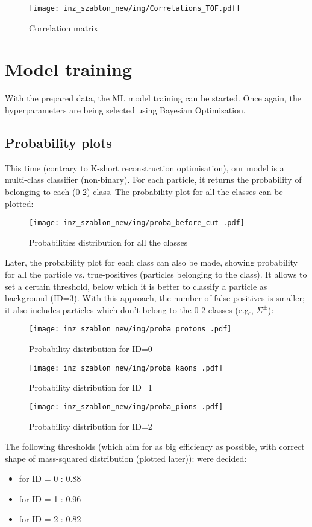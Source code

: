 \begin{figure}[h!]
    \centering
    \texttt{[image: inz\_szablon\_new/img/Correlations\_TOF.pdf]}
    \caption{Correlation matrix}
    \label{cmatrix tof}
\end{figure}

\section{Model training}
With the prepared data, the ML model training can be started. Once again, the hyperparameters are being selected using Bayesian Optimisation. 

\subsection{Probability plots}
This time (contrary to K-short reconstruction optimisation), our model is a multi-class classifier (non-binary). For each particle, it returns the probability of belonging to each (0-2) class. The probability plot for all the classes can be plotted:
\begin{figure}[H]
    \centering
    \texttt{[image: inz\_szablon\_new/img/proba\_before\_cut .pdf]}
    \caption{Probabilities distribution for all the classes}
\end{figure}

Later, the probability plot for each class can also be made, showing probability for all the particle vs. true-positives (particles belonging to the class). It allows to set a certain threshold, below which it is better to classify a particle as background (ID=3). With this approach, the number of false-positives is smaller; it also includes particles which don't belong to the 0-2 classes (e.g., $\Sigma^\pm$):
\begin{figure}[H]
    \centering
    \texttt{[image: inz\_szablon\_new/img/proba\_protons .pdf]}
    \caption{Probability distribution for ID=0 }
\end{figure}
\begin{figure}[H]
    \centering
    \texttt{[image: inz\_szablon\_new/img/proba\_kaons .pdf]}
    \caption{Probability distribution for ID=1}
\end{figure}
\begin{figure}[H]
    \centering
    \texttt{[image: inz\_szablon\_new/img/proba\_pions .pdf]}
    \caption{Probability distribution for ID=2 }
\end{figure}
The following thresholds (which aim for as big efficiency as possible, with correct shape of mass-squared distribution (plotted later)): were decided:
\begin{itemize}
    \item for ID = 0 : 0.88
    \item for ID = 1 : 0.96
    \item for ID = 2 : 0.82
\end{itemize}


